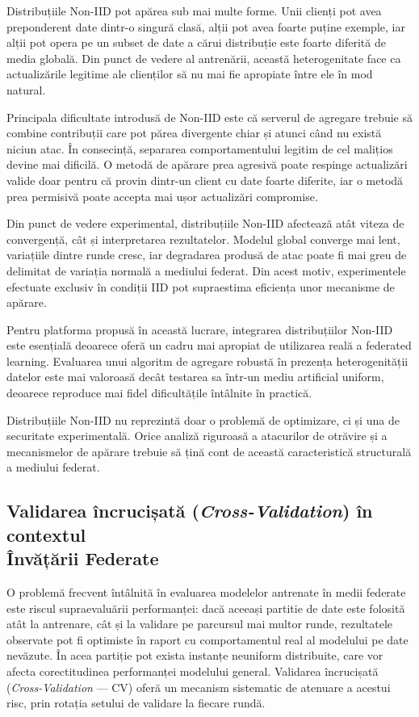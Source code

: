 \documentclass[../../main.tex]{subfiles}
\begin{document}
    Distribuțiile Non-IID pot apărea sub mai multe forme. Unii clienți pot avea preponderent date dintr-o singură clasă, alții pot avea foarte puține exemple, iar alții pot opera pe un subset de date a cărui distribuție este foarte diferită de media globală. Din punct de vedere al antrenării, această heterogenitate face ca actualizările legitime ale clienților să nu mai fie apropiate între ele în mod natural.

    Principala dificultate introdusă de Non-IID este că serverul de agregare trebuie să combine contribuții care pot părea divergente chiar și atunci când nu există niciun atac. În consecință, separarea comportamentului legitim de cel malițios devine mai dificilă. O metodă de apărare prea agresivă poate respinge actualizări valide doar pentru că provin dintr-un client cu date foarte diferite, iar o metodă prea permisivă poate accepta mai ușor actualizări compromise.

    Din punct de vedere experimental, distribuțiile Non-IID afectează atât viteza de convergență, cât și interpretarea rezultatelor. Modelul global converge mai lent, variațiile dintre runde cresc, iar degradarea produsă de atac poate fi mai greu de delimitat de variația normală a mediului federat. Din acest motiv, experimentele efectuate exclusiv în condiții IID pot supraestima eficiența unor mecanisme de apărare.

    Pentru platforma propusă în această lucrare, integrarea distribuțiilor Non-IID este esențială deoarece oferă un cadru mai apropiat de utilizarea reală a federated learning. Evaluarea unui algoritm de agregare robustă în prezența heterogenității datelor este mai valoroasă decât testarea sa într-un mediu artificial uniform, deoarece reproduce mai fidel dificultățile întâlnite în practică.

    Distribuțiile Non-IID nu reprezintă doar o problemă de optimizare, ci și una de securitate experimentală. Orice analiză riguroasă a atacurilor de otrăvire și a mecanismelor de apărare trebuie să țină cont de această caracteristică structurală a mediului federat.

    \subsection{Validarea încrucișată (\textit{Cross-Validation}) în contextul \\ Învățării Federate}

    O problemă frecvent întâlnită în evaluarea modelelor antrenate în medii federate este riscul supraevaluării performanței: dacă aceeași partitie de date este folosită atât la antrenare, cât și la validare pe parcursul mai multor runde, rezultatele observate pot fi optimiste în raport cu comportamentul real al modelului pe date nevăzute. În acea partiție pot exista instanțe neuniform distribuite, care vor afecta corectitudinea performanței modelului general. Validarea încrucișată (\textit{Cross-Validation} --- CV) oferă un mecanism sistematic de atenuare a acestui risc, prin rotația setului de validare la fiecare rundă.
\end{document}
